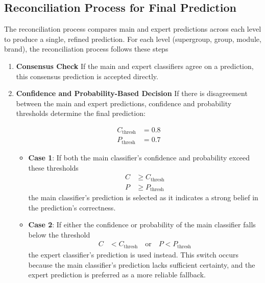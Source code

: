 \documentclass[9pt,a4paper,twoside]{rho-class/rho}
\begin{document}
 \subsection{Reconciliation Process for Final Prediction}

 The reconciliation process compares main and expert predictions across each level to produce a single, refined prediction. For each level (supergroup, group, module, brand), the reconciliation process follows these steps

    \begin{enumerate}
        \item \textbf{Consensus Check}
        If the main and expert classifiers agree on a prediction, this consensus prediction is accepted directly.
        
        \item \textbf{Confidence and Probability-Based Decision}
        If there is disagreement between the main and expert predictions, confidence and probability thresholds determine the final prediction:
        
        \begin{align*}
            C_{\text{thresh}} &= 0.8 \\
            P_{\text{thresh}} &= 0.7
        \end{align*}
        
        \begin{itemize}
            \item \textbf{Case 1}: If both the main classifier’s confidence and probability exceed these thresholds 
            \begin{align*}
                C &\geq C_{\text{thresh}} \\
                P &\geq P_{\text{thresh}}
            \end{align*}
            the main classifier’s prediction is selected as it indicates a strong belief in the prediction's correctness.

            \item \textbf{Case 2}: If either the confidence or probability of the main classifier falls below the threshold 
            \begin{align*}
                C &< C_{\text{thresh}} \quad \text{or} \quad P < P_{\text{thresh}}
            \end{align*}
            the expert classifier’s prediction is used instead. This switch occurs because the main classifier’s prediction lacks sufficient certainty, and the expert prediction is preferred as a more reliable fallback.
        \end{itemize}


\end{enumerate}
\end{document}
